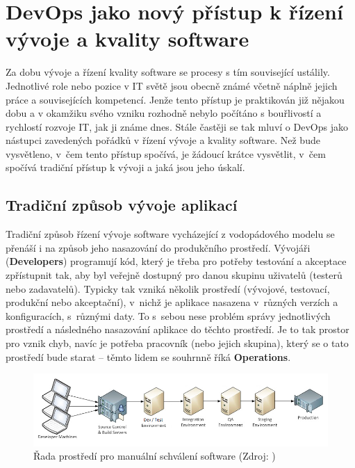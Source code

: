 \documentclass[FM,DP]{tulthesis}
\begin{document}
\chapter{DevOps jako nový přístup k řízení vývoje a kvality software}

Za dobu vývoje a řízení kvality software se procesy s tím související ustálily. Jednotlivé role
nebo pozice v IT světě jsou obecně známé včetně náplně jejich práce a souvisejících kompetencí. 
Jenže tento přístup je praktikován již nějakou dobu a v okamžiku svého vzniku rozhodně nebylo počítáno
s bouřlivostí a rychlostí rozvoje IT, jak ji známe dnes. Stále častěji se tak mluví o DevOps jako
nástupci zavedených pořádků v řízení vývoje a kvality software. Než bude vysvětleno, v~čem tento
přístup spočívá, je žádoucí krátce vysvětlit, v~čem spočívá tradiční přístup k vývoji a jaká jsou jeho
úskalí.

\section{Tradiční způsob vývoje aplikací}

Tradiční způsob řízení vývoje software vycházející z vodopádového modelu se přenáší i na způsob
jeho nasazování do produkčního prostředí. Vývojáři (\textbf{Developers}) programují kód, který je
třeba pro potřeby testování a akceptace zpřístupnit tak, aby byl veřejně dostupný pro danou skupinu 
uživatelů (testerů nebo zadavatelů). Typicky tak vzniká několik prostředí (vývojové, testovací, 
produkční nebo akceptační), v~nichž je aplikace nasazena v~různých verzích a konfiguracích, s~různými daty. 
To s~sebou nese problém správy jednotlivých prostředí a následného nasazování aplikace do těchto prostředí.
Je to tak prostor pro vznik chyb, navíc je potřeba pracovník (nebo jejich skupina), který se
o tato prostředí bude starat -- těmto lidem se souhrnně říká \textbf{Operations}.

\begin{figure}[h]
\center
\includegraphics[width=\textwidth]{deployment.png}
\caption{Řada prostředí pro manuální schválení software (Zdroj: \cite{deployment})}
\label{deployment}
\end{figure}
\end{document}
